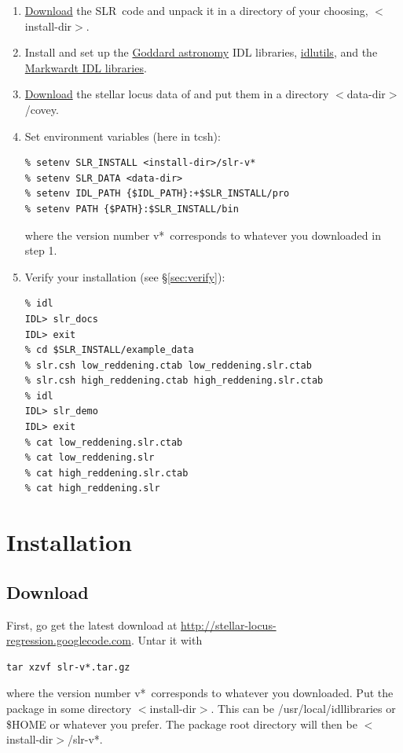 \documentclass{report}
\newcommand{\slr}{SLR}
\begin{document}
\begin{enumerate}
\item \href{http://stellar-locus-regression.googlecode.com}{Download}
  the \slr\ code and unpack it in a directory of your choosing,
  $<$install-dir$>$.
\item Install and set up the \href{http://idlastro.gsfc.nasa.gov}{Goddard
    astronomy} IDL libraries,
  \href{http://www.astro.princeton.edu/~schlegel/code.html}{idlutils},
  and the \href{http://www.physics.wisc.edu/~craigm/idl}{Markwardt IDL
    libraries}.
\item
  \href{http://www.cfa.harvard.edu/~kcovey/research/medianlocus.tbl}{Download}
  the stellar locus data of \citet{bib:covey} and put them in a
  directory $<$data-dir$>$/covey.
\item Set environment variables (here in tcsh):
\begin{verbatim}
% setenv SLR_INSTALL <install-dir>/slr-v*
% setenv SLR_DATA <data-dir>
% setenv IDL_PATH {$IDL_PATH}:+$SLR_INSTALL/pro
% setenv PATH {$PATH}:$SLR_INSTALL/bin
\end{verbatim}
  where the version number v*\ corresponds to whatever you
  downloaded in step 1.
\item Verify your installation (see \S\ref{sec:verify}):
\begin{verbatim}
% idl
IDL> slr_docs
IDL> exit
% cd $SLR_INSTALL/example_data
% slr.csh low_reddening.ctab low_reddening.slr.ctab
% slr.csh high_reddening.ctab high_reddening.slr.ctab
% idl
IDL> slr_demo
IDL> exit
% cat low_reddening.slr.ctab
% cat low_reddening.slr
% cat high_reddening.slr.ctab
% cat high_reddening.slr
\end{verbatim}
\end{enumerate}


\chapter{Installation}

\section{Download}

First, go get the latest download at
\url{http://stellar-locus-regression.googlecode.com}. Untar it with
\begin{verbatim}
tar xzvf slr-v*.tar.gz
\end{verbatim}
where the version number v*\ corresponds to whatever you downloaded.
Put the package in some directory $<$install-dir$>$. This can be
/usr/local/idllibraries or \$HOME or whatever you prefer. The package
root directory will then be $<$install-dir$>$/slr-v*.
\end{document}
